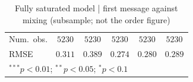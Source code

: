\begin{table}
\begin{center}
\begin{tabular}{l c c || c c || c}
Num.\ obs.                  & $5230$        & $5230$        & $5230$        & $5230$        & $5230$        \\
RMSE                        & $0.311$       & $0.389$       & $0.274$       & $0.280$       & $0.289$       \\
\hline
\multicolumn{6}{l}{\scriptsize{$^{***}p<0.01$; $^{**}p<0.05$; $^{*}p<0.1$}}
\end{tabular}
\caption{Fully saturated model | first message against mixing (subsample; not the order figure)}
\label{table:saturated_0}
\end{center}
\end{table}

